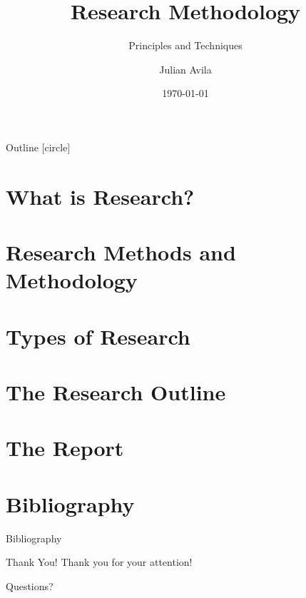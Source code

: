 \documentclass[sn-mathphys-num]{beamer}
\title{Research Methodology}
\subtitle{Principles and Techniques}
\author{Julian Avila}
\institute{Universidad Distrital Francisco José de Caldas}
\date{\today}
\begin{document}
\begin{frame}
	\titlepage
\end{frame}

\begin{frame}{Outline}
	[circle]
	\tableofcontents
\end{frame}

\section{What is Research?}


\section{Research Methods and Methodology}


\section{Types of Research}


\section{The Research Outline}


\section{The Report}


\section{Bibliography}
\begin{frame}[allowframebreaks]{Bibliography}
	\footnotesize
	\printbibliography
	\nocite{*}
\end{frame}

\begin{frame}{Thank You!}
	\centering
	{\LARGE Thank you for your attention!}
	\vspace{0.5cm}

	\Large Questions?
\end{frame}
\end{document}
